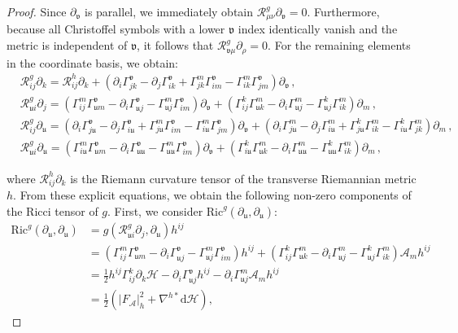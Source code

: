 \documentclass[10pt,a4paper,twoside,reqno]{amsart}
\theoremstyle{plain}
\theoremstyle{definition}
\theoremstyle{remark}
\def\dd{\mathrm{d}}
\def\cR{{\mathcal R}}
\def\cH{\mathcal{H}}
\def\cA{\mathcal{A}}
\def\cH{\mathcal{H}}
\def\dd{\mathrm{d}}
\def\fru{\mathfrak{u}}
\def\frv{\mathfrak{v}}
\def\Ric{\mathrm{Ric}}
\begin{document}
\begin{proof}
\noindent
Since $\partial_\frv$ is parallel, we immediately obtain $\cR^g_{\mu\nu}\partial_{\frv} = 0$. Furthermore, because all Christoffel symbols with a lower $\frv$ index identically vanish and the metric is independent of $\frv$, it follows that $\cR^g_{\frv\mu}\partial_{\rho} = 0$. For the remaining elements in the coordinate basis, we obtain:
\begin{eqnarray*}
& \cR^g_{ij}\partial_{k} = \cR^{h}_{ij}\partial_{k} + ( \partial_i \Gamma^{\frv}_{jk} - \partial_j \Gamma^{\frv}_{ik} + \Gamma^m_{jk}\Gamma^{\frv}_{im} - \Gamma^m_{ik}\Gamma^{\frv}_{jm} ) \partial_{\frv}  \, , \\
& \cR^g_{\fru i}\partial_{j} = ( \Gamma^m_{ij}\Gamma^{\frv}_{\fru m} - \partial_i \Gamma^{\frv}_{\fru j} - \Gamma^m_{\fru j}\Gamma^{\frv}_{im} ) \partial_{\frv} + (\Gamma^k_{ij}\Gamma^m_{\fru k} - \partial_i \Gamma^{m}_{\fru j}  - \Gamma^k_{\fru j}\Gamma^m_{ik} ) \partial_{m} \, , \\
& \cR^g_{ij}\partial_{\fru } = ( \partial_i \Gamma^{\frv}_{j\fru } - \partial_j \Gamma^{\frv}_{i\fru } + \Gamma^m_{j\fru }\Gamma^{\frv}_{im} - \Gamma^m_{i\fru }\Gamma^{\frv}_{jm} ) \partial_{\frv} + ( \partial_i \Gamma^{m}_{j\fru } - \partial_j \Gamma^{m}_{i\fru } + \Gamma^k_{j\fru }\Gamma^m_{ik} - \Gamma^k_{i\fru }\Gamma^m_{jk} ) \partial_{m} \, , \\
& \cR^g_{\fru i}\partial_{\fru } = ( \Gamma^m_{i\fru }\Gamma^{\frv}_{\fru m} - \partial_i \Gamma^{\frv}_{\fru \fru } - \Gamma^m_{\fru \fru }\Gamma^{\frv}_{im} ) \partial_{\frv} + (\Gamma^k_{i\fru }\Gamma^m_{\fru k} - \partial_i \Gamma^{m}_{\fru \fru } - \Gamma^k_{\fru \fru }\Gamma^m_{ik} ) \partial_{m} \, ,
\end{eqnarray*}
 
\noindent
where $\cR^{h}_{ij}\partial_{k}$ is the Riemann curvature tensor of the transverse Riemannian metric $h$. From these explicit equations, we obtain the following non-zero components of the Ricci tensor of $g$. First, we consider $\mathrm{Ric}^g (\partial_{\fru} , \partial_{\fru})$:
\begin{align*}
\Ric^g (\partial_{\fru} , \partial_{\fru}) &= g( \cR^g_{\fru i}\partial_{j} , \partial_{\fru}) h^{ij}  \\
&= ( \Gamma^m_{ij}\Gamma^\frv_{\fru m} - \partial_i \Gamma^{\frv}_{\fru j}  - \Gamma^m_{\fru j}\Gamma^{\frv}_{im} ) h^{ij} + (\Gamma^k_{ij}\Gamma^m_{\fru k} - \partial_i \Gamma^{m}_{\fru j}  - \Gamma^k_{\fru j}\Gamma^m_{ik} ) \cA_m h^{ij} \\
& =  \frac{1}{2} h^{ij} \Gamma^k_{ij} \partial_k \cH - \partial_i \Gamma^{\frv}_{\fru j}  h^{ij}  - \partial_i \Gamma^{m}_{\fru j}  \cA_m h^{ij} \\
&= \frac{1}{2} \left( \vert F_{\cA}\vert^2_{h} + \nabla^{h\ast}\dd \cH  \right),
\end{align*}


\end{proof}
\end{document}
